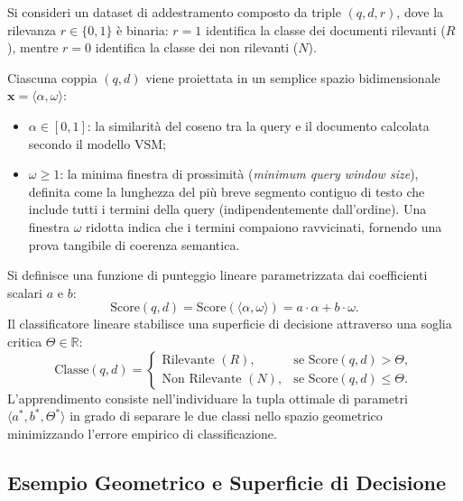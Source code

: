 Si consideri un dataset di addestramento composto da triple $(q, d, r)$, dove la rilevanza $r \in \{0, 1\}$ \`e binaria: $r = 1$ identifica la classe dei documenti rilevanti ($R$), mentre $r = 0$ identifica la classe dei non rilevanti ($N$).

Ciascuna coppia $(q, d)$ viene proiettata in un semplice spazio bidimensionale $\mathbf{x} = \langle \alpha, \omega \rangle$:
\begin{itemize}
    \item $\alpha \in [0, 1]$: la similarit\`a del coseno tra la query e il documento calcolata secondo il modello VSM;
    \item $\omega \ge 1$: la minima finestra di prossimit\`a (\textit{minimum query window size}), definita come la lunghezza del pi\`u breve segmento contiguo di testo che include tutti i termini della query (indipendentemente dall'ordine). Una finestra $\omega$ ridotta indica che i termini compaiono ravvicinati, fornendo una prova tangibile di coerenza semantica.
\end{itemize}

Si definisce una funzione di punteggio lineare parametrizzata dai coefficienti scalari $a$ e $b$:
\begin{equation}
    \text{Score}(q, d) = \text{Score}(\langle \alpha, \omega \rangle) = a \cdot \alpha + b \cdot \omega.
    \label{eq:linear-score-function}
\end{equation}
Il classificatore lineare stabilisce una superficie di decisione attraverso una soglia critica $\Theta \in \mathbb{R}$:
\begin{equation}
    \text{Classe}(q, d) = 
    \begin{cases}
        \text{Rilevante } (R), & \text{se } \text{Score}(q, d) > \Theta, \\
        \text{Non Rilevante } (N), & \text{se } \text{Score}(q, d) \le \Theta.
    \end{cases}
    \label{eq:linear-decision-rule}
\end{equation}
L'apprendimento consiste nell'individuare la tupla ottimale di parametri $\langle a^*, b^*, \Theta^* \rangle$ in grado di separare le due classi nello spazio geometrico minimizzando l'errore empirico di classificazione.

\FloatBarrier
\subsection{Esempio Geometrico e Superficie di Decisione}
\label{subsec:esempio-geometrico-superficie}

